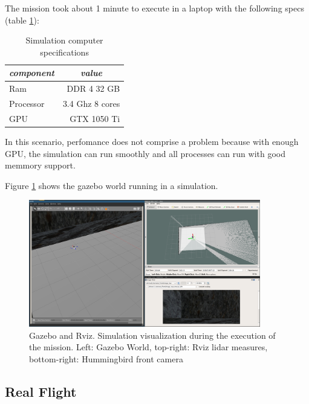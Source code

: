     The mission took about 1 minute to execute in a laptop with the following specs (table \ref{ch_5:table:laptop_specs}):

    \begin{table}[!h]
      \centering
      \begin{tabular}{lr} \toprule
        \multicolumn{1}{c}{\textit{component}} & \multicolumn{1}{c}{\textit{value}}   \\ \midrule
        Ram           & DDR 4 32 GB     \\
        Processor     & 3.4 Ghz 8 cores \\
        GPU           & GTX 1050 Ti     \\ \bottomrule
        \hline
      \end{tabular}
      \caption{Simulation computer specifications}
      \label{ch_5:table:laptop_specs}
    \end{table}

    In this scenario, perfomance does not comprise a problem because with enough GPU, the simulation can run smoothly and all processes can run with good memmory support. 

    Figure \ref{ch_5:fig:full_sim} shows the gazebo world running in a simulation.
    
    \begin{figure}
      \centering
      \includegraphics[width=0.9\textwidth,height=0.5\textheight,keepaspectratio]{./Figures/FullSim.png}
      \caption{Gazebo and Rviz. Simulation visualization during the execution of the mission. Left: Gazebo World, top-right: Rviz lidar measures, bottom-right: Hummingbird front camera}
      \label{ch_5:fig:full_sim}
    \end{figure}

  \subsection{Real Flight} \label{ch_5:subsect:exp_real_flight}

